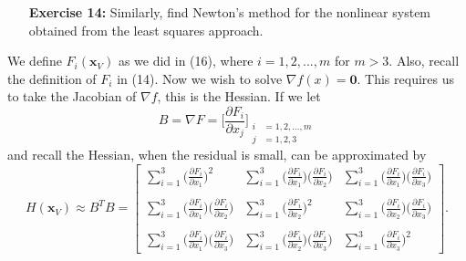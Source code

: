 \documentclass[11pt]{article}
\theoremstyle{definition}
\newcommand{\1}[1]{\mathbf{1} \left \{ #1 \right \}}
\begin{document}
\begin{itemize}
\item[{\textbf{Exercise 14:}}] Similarly, find Newton's method for the nonlinear system obtained from the least squares approach.
\end{itemize}
We define $F_i (\textbf{x}_V)$ as we did in (16), where $i = 1,2,...,m$ for $m>3$.  Also, recall the definition of $F_i$ in (14).  Now we wish to solve $\nabla f(x) = \textbf{0}$.  This requires us to take the Jacobian of $\nabla f$, this is the Hessian.  If we let
\[B = \nabla F = \Bigg[\frac{\partial F_i}{\partial x_j}\Bigg]_{\begin{split}
    i &= 1,2,...,m \\
    j &= 1,2,3
\end{split}}\]
and recall the Hessian, when the residual is small, can be approximated by
\[H(\textbf{x}_V) \approx B^T B = \begin{bmatrix}
\sum_{i=1}^3\Big(\frac{\partial F_i}{\partial x_1}\Big)^2 & \sum_{i=1}^3\Big(\frac{\partial F_i}{\partial x_1}\Big)\Big(\frac{\partial F_i}{\partial x_2}\Big) & \sum_{i=1}^3\Big(\frac{\partial F_i}{\partial x_1}\Big)\Big(\frac{\partial F_i}{\partial x_3}\Big) \\ \\
\sum_{i=1}^3\Big(\frac{\partial F_i}{\partial x_1}\Big)\Big(\frac{\partial F_i}{\partial x_2}\Big) & \sum_{i=1}^3\Big(\frac{\partial F_i}{\partial x_2}\Big)^2 & \sum_{i=1}^3\Big(\frac{\partial F_i}{\partial x_2}\Big)\Big(\frac{\partial F_i}{\partial x_3}\Big) \\ \\
\sum_{i=1}^3\Big(\frac{\partial F_i}{\partial x_1}\Big)\Big(\frac{\partial F_i}{\partial x_3}\Big) & \sum_{i=1}^3\Big(\frac{\partial F_i}{\partial x_2}\Big)\Big(\frac{\partial F_i}{\partial x_3}\Big) & \sum_{i=1}^3\Big(\frac{\partial F_i}{\partial x_3}\Big)^2
\end{bmatrix}.\]
\end{document}
